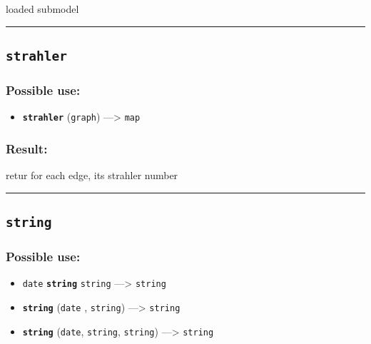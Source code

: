 \documentclass[]{book}
\providecommand{\tightlist}{%
  \setlength{\itemsep}{0pt}\setlength{\parskip}{0pt}}
\theoremstyle{definition}
\theoremstyle{definition}
\theoremstyle{definition}
\theoremstyle{remark}
\begin{document}
loaded submodel

\begin{center}\rule{0.5\linewidth}{\linethickness}\end{center}

\subsection{\texorpdfstring{\texttt{strahler}}{strahler}}\label{strahler}

\subsubsection{Possible use:}\label{possible-use-504}

\begin{itemize}
\tightlist
\item
  \textbf{\texttt{strahler}} (\texttt{graph}) ---\textgreater{}
  \texttt{map}
\end{itemize}

\subsubsection{Result:}\label{result-487}

retur for each edge, its strahler number

\begin{center}\rule{0.5\linewidth}{\linethickness}\end{center}

\subsection{\texorpdfstring{\texttt{string}}{string}}\label{string}

\subsubsection{Possible use:}\label{possible-use-505}

\begin{itemize}
\tightlist
\item
  \texttt{date} \textbf{\texttt{string}} \texttt{string}
  ---\textgreater{} \texttt{string}
\item
  \textbf{\texttt{string}} (\texttt{date} , \texttt{string})
  ---\textgreater{} \texttt{string}
\item
  \textbf{\texttt{string}} (\texttt{date}, \texttt{string},
  \texttt{string}) ---\textgreater{} \texttt{string}
\end{itemize}
\end{document}
